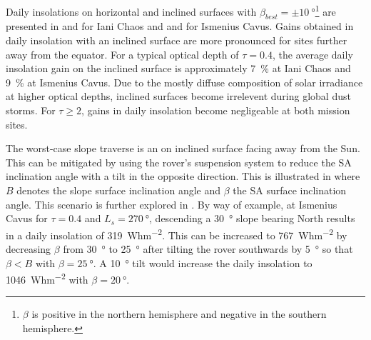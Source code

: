 \vspace{0.5cm}

Daily insolations on horizontal and inclined surfaces with $\beta_{best}=\pm\SI{10}{\degree}$\footnote{$\beta$ is positive in the northern hemisphere and negative in the southern hemisphere.} are presented in  and  for Iani Chaos and  and  for Ismenius Cavus. Gains obtained in daily insolation with an inclined surface are more pronounced for sites further away from the equator. For a typical optical depth of $\tau = 0.4$, the average daily insolation gain on the inclined surface is approximately \SI{7}{\percent} at Iani Chaos and \SI{9}{\percent} at Ismenius Cavus.
Due to the mostly diffuse composition of solar irradiance at higher optical depths, inclined surfaces become irrelevent during global dust storms. For $\tau \geq 2$, gains in daily insolation become negligeable at both mission sites.



\vspace{0.5cm}



\vspace{0.5cm}



\vspace{0.5cm}



The worst-case slope traverse is an on inclined surface facing away from the Sun. This can be mitigated by using the rover's suspension system to reduce the \ac{SA} inclination angle with a tilt in the opposite direction. This is illustrated in  where $B$ denotes the slope surface inclination angle and $\beta$ the \ac{SA} surface inclination angle. This scenario is further explored in . By way of example, at Ismenius Cavus for $\tau = 0.4$ and $L_{s}=\SI{270}{\degree}$, descending a \SI{30}{\degree} slope bearing North results in a daily insolation of \SI{319}{Whm^{-2}}. This can be increased to \SI{767}{Whm^{-2}} by decreasing $\beta$ from \SI{30}{\degree} to \SI{25}{\degree} after tilting the rover southwards by \SI{5}{\degree} so that $\beta < B$ with $\beta = \SI{25}{\degree}$. A \SI{10}{\degree} tilt would increase the daily insolation to \SI{1046}{Whm^{-2}} with $\beta = \SI{20}{\degree}$.


